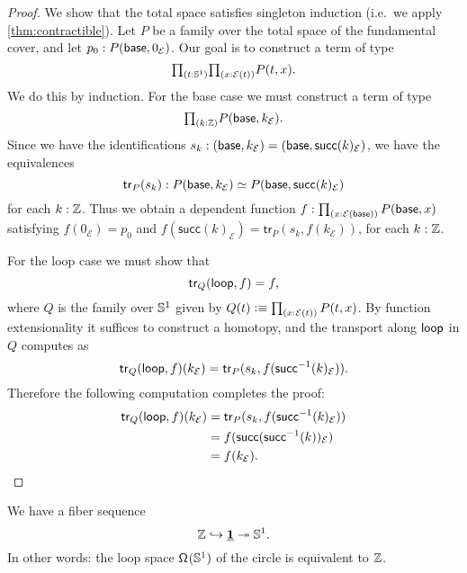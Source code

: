 \begin{proof}
We show that the total space satisfies singleton induction (i.e.~we apply \cref{thm:contractible}). Let $P$ be a family over the total space of the fundamental cover, and let $p_0:P(\mathsf{base},0_{\mathcal{E}})$. Our goal is to construct a term of type
\begin{equation*}
\prd{t:\sphere{1}}{x:\mathcal{E}(t)} P(t,x).
\end{equation*}
We do this by induction. For the base case we must construct a term of type
\begin{equation*}
\prd{k:\Z}P(\base,k_{\mathcal{E}}).
\end{equation*}
Since we have the identifications $s_k: (\mathsf{base},k_{\mathcal{E}})=(\mathsf{base},\mathsf{succ}(k)_{\mathcal{E}})$, we have the equivalences
\begin{equation*}
\mathsf{tr}_P(s_k) : \eqv{P(\base,k_{\mathcal{E}})}{P(\base,\mathsf{succ}(k)_{\mathcal{E}})}
\end{equation*}
for each $k:\mathbb{Z}$. Thus we obtain a dependent function $f:\prd{x:\mathcal{E}(\base)}P(\base,x)$ satisfying $f(0_{\mathcal{E}})=p_0$ and $f(\mathsf{succ}(k)_{\mathcal{E}})=\mathsf{tr}_P(s_k,f(k_{\mathcal{E}}))$, for each $k:\mathbb{Z}$. 

For the loop case we must show that
\begin{equation*}
\mathsf{tr}_Q(\mathsf{loop},f)=f,
\end{equation*}
where $Q$ is the family over $\mathbb{S}^{1}$ given by $Q(t)\defeq \prd{x:\mathcal{E}(t)} P(t,x)$. By function extensionality it suffices to construct a homotopy, and the transport along $\mathsf{loop}$ in $Q$ computes as
\begin{equation*}
\mathsf{tr}_Q(\mathsf{loop},f)(k_{\mathcal{E}})= \mathsf{tr}_P(s_k,f(\mathsf{succ}^{-1}(k)_{\mathcal{E}})). 
\end{equation*}
Therefore the following computation completes the proof:
\begin{align*}
\mathsf{tr}_Q(\mathsf{loop},f)(k_{\mathcal{E}})
& = \mathsf{tr}_P(s_k,f(\mathsf{succ}^{-1}(k)_{\mathcal{E}})) \\
& = f(\mathsf{succ}(\mathsf{succ}^{-1}(k))_{\mathcal{E}}) \\
& = f(k_{\mathcal{E}}).\qedhere
\end{align*}
\end{proof}

\begin{cor}\label{cor:circle_loopspace}
We have a fiber sequence
\begin{equation*}
\mathbb{Z} \hookrightarrow \underline{\mathbf{1}} \twoheadrightarrow \mathbb{S}^{1}.
\end{equation*}
In other words: the loop space $\mathsf{\Omega}^{}(\mathbb{S}^{1})$ of the circle is equivalent to $\mathbb{Z}$.
\end{cor}

